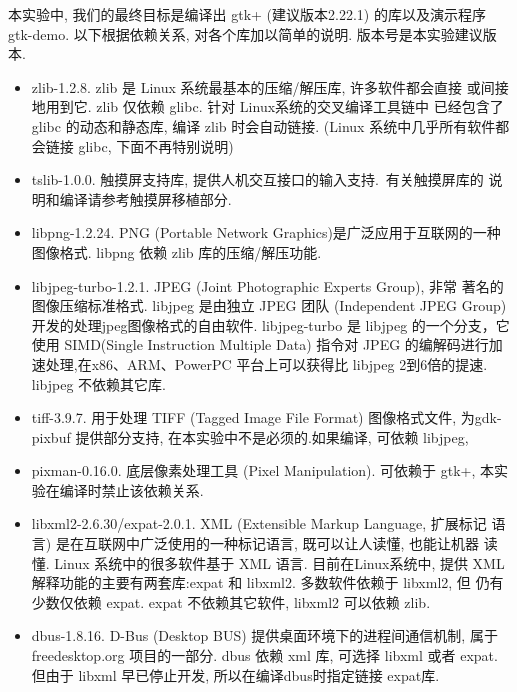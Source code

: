 本实验中, 我们的最终目标是编译出 gtk+ (建议版本2.22.1) 的库以及演示程序
gtk-demo. 以下根据依赖关系, 对各个库加以简单的说明. 版本号是本实验建议版本.
\begin{itemize}
  \item zlib-1.2.8. zlib 是 Linux 系统最基本的压缩/解压库, 许多软件都会直接
      或间接地用到它. zlib 仅依赖 glibc. 针对 Linux系统的交叉编译工具链中
      已经包含了 glibc 的动态和静态库, 编译 zlib 时会自动链接.
      (Linux 系统中几乎所有软件都会链接 glibc, 下面不再特别说明)

  \item tslib-1.0.0. 触摸屏支持库, 提供人机交互接口的输入支持.~有关触摸屏库的
      说明和编译请参考触摸屏移植部分.

  \item libpng-1.2.24. PNG (Portable Network Graphics)是广泛应用于互联网的一种
      图像格式. libpng 依赖 zlib 库的压缩/解压功能.

  \item libjpeg-turbo-1.2.1. JPEG (Joint Photographic Experts Group), 非常
      著名的图像压缩标准格式. libjpeg 是由独立 JPEG 团队 (Independent
        JPEG Group) 开发的处理jpeg图像格式的自由软件. libjpeg-turbo 是
        libjpeg 的一个分支，它使用 SIMD(Single Instruction Multiple Data)
        指令对 JPEG 的编解码进行加速处理,在x86、ARM、PowerPC
        平台上可以获得比 libjpeg 2到6倍的提速. libjpeg 不依赖其它库.
  \item tiff-3.9.7. 用于处理 TIFF (Tagged Image File Format) 图像格式文件,
      为gdk-pixbuf 提供部分支持, 在本实验中不是必须的.如果编译,
        可依赖 libjpeg,

  \item pixman-0.16.0. 底层像素处理工具 (Pixel Manipulation). 可依赖于
      gtk+, 本实验在编译时禁止该依赖关系.

  \item libxml2-2.6.30/expat-2.0.1. XML (Extensible Markup Language, 扩展标记
      语言) 是在互联网中广泛使用的一种标记语言, 既可以让人读懂, 也能让机器
      读懂. Linux 系统中的很多软件基于 XML 语言. 目前在Linux系统中, 提供 XML
      解释功能的主要有两套库:expat 和 libxml2. 多数软件依赖于 libxml2, 但
      仍有少数仅依赖 expat. expat 不依赖其它软件, libxml2 可以依赖 zlib.

  \item dbus-1.8.16. D-Bus (Desktop BUS) 提供桌面环境下的进程间通信机制, 属于
      freedesktop.org 项目的一部分. dbus 依赖 xml 库, 可选择 libxml 或者
      expat. 但由于 libxml 早已停止开发, 所以在编译dbus时指定链接 expat库.


\end{itemize}
